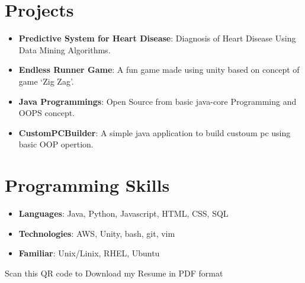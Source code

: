 \documentclass[letterpaper,11pt]{article}
\makeatletter
\newcommand{\resumeItem}[2]{
  \item\small{
    \textbf{#1}{: #2 \vspace{-2pt}}
  }
}
\newcommand{\resumeSubheading}[4]{
  \vspace{-1pt}\item
    \begin{tabular*}{0.97\textwidth}[t]{l@{\extracolsep{\fill}}r}
      \textbf{#1} & #2 \\
      \textit{\small#3} & \textit{\small #4} \\
    \end{tabular*}\vspace{-5pt}
}
\newcommand{\resumeSubItem}[2]{\resumeItem{#1}{#2}\vspace{-4pt}}
\newcommand{\resumeSubHeadingListStart}{\begin{itemize}[leftmargin=*]}
\newcommand{\resumeSubHeadingListEnd}{\end{itemize}}
\newcommand{\resumeItemListStart}{\begin{itemize}}
\newcommand{\resumeItemListEnd}{\end{itemize}\vspace{-5pt}}
\makeatother
\begin{document}



\section{Projects}
\resumeSubHeadingListStart
\resumeSubItem{Predictive System for Heart Disease}
{Diagnosis of Heart Disease Using Data Mining Algorithms.}
\resumeSubItem{Endless Runner Game}
{A fun game made using unity based on concept of game ‘Zig Zag’.}
\resumeSubItem{Java Programmings}
{Open Source from basic java-core Programming and OOPS concept.}
\resumeSubItem{CustomPCBuilder}
{A simple java application to build custoum pc using basic OOP opertion.}
\resumeSubHeadingListEnd

%
\section{Programming Skills}
\resumeSubHeadingListStart
\item{
            \textbf{Languages}{: Java, Python, Javascript, HTML, CSS, SQL}
      }
\item{
            \textbf{Technologies}{: AWS, Unity, bash, git, vim}
      }
\item {
            \textbf{Familiar}{: Unix/Linix, RHEL, Ubuntu }
      }
\resumeSubHeadingListEnd



\quad
{Scan this QR code to Download my Resume in PDF format }
\qquad

\end{document}
